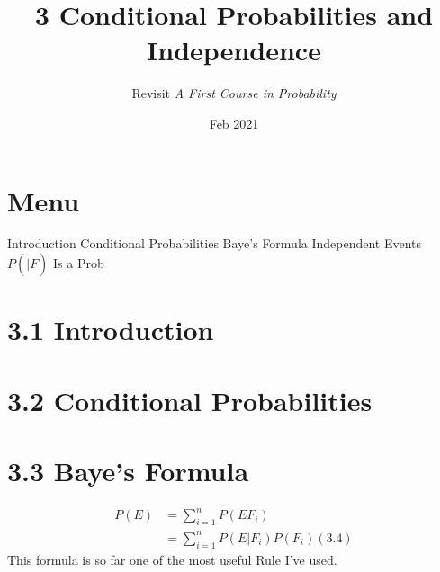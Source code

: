 \documentclass{article}
\title{3 Conditional Probabilities and Independence}
\author{Revisit \emph{A First Course in Probability}}
\date{Feb 2021}
\begin{document}
\maketitle

\section*{Menu}
\begin{outline}[enumerate]
    \1  Introduction
    \1  Conditional Probabilities
    \1  Baye's Formula
    \1  Independent Events
    \1  $P(\dot | F)$ Is a Prob
\end{outline}


\section*{3.1 Introduction}
\section*{3.2 Conditional Probabilities}
\section*{3.3 Baye's Formula}
\begin{align*}
P(E) &= \sum_{i=1}^n P(EF_i) \\
     &= \sum_{i=1}^n P(E|F_i)P(F_i) (3.4)
\end{align*}
This formula is so far one of the most useful Rule I've used. 


\end{document}
